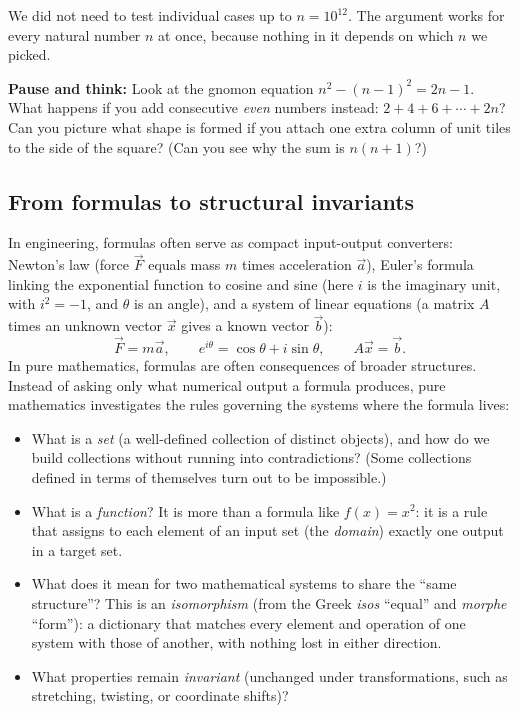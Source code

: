 We did not need to test individual cases up to $n = 10^{12}$. The argument works for every natural number $n$ at once, because nothing in it depends on which $n$ we picked.

\begin{recoverybox}
\textbf{Pause and think:} Look at the gnomon equation $n^2 - (n-1)^2 = 2n - 1$. What happens if you add consecutive \emph{even} numbers instead: $2 + 4 + 6 + \cdots + 2n$? Can you picture what shape is formed if you attach one extra column of unit tiles to the side of the square? (Can you see why the sum is $n(n+1)$?)
\end{recoverybox}

\subsection{From formulas to structural invariants}

In engineering, formulas often serve as compact input-output converters: Newton's law (force $\vec F$ equals mass $m$ times acceleration $\vec a$), Euler's formula linking the exponential function to cosine and sine (here $i$ is the imaginary unit, with $i^2 = -1$, and $\theta$ is an angle), and a system of linear equations (a matrix $A$ times an unknown vector $\vec x$ gives a known vector $\vec b$):
\[
\vec{F} = m\vec{a}, \qquad e^{i\theta} = \cos\theta + i\sin\theta, \qquad A\vec{x} = \vec{b}.
\]
In pure mathematics, formulas are often consequences of broader structures. Instead of asking only what numerical output a formula produces, pure mathematics investigates the rules governing the systems where the formula lives:
\begin{itemize}
\item What is a \emph{set} (a well-defined collection of distinct objects), and how do we build collections without running into contradictions? (Some collections defined in terms of themselves turn out to be impossible.)
\item What is a \emph{function}? It is more than a formula like $f(x) = x^2$: it is a rule that assigns to each element of an input set (the \emph{domain}) exactly one output in a target set.
\item What does it mean for two mathematical systems to share the ``same structure''? This is an \emph{isomorphism} (from the Greek \emph{isos} ``equal'' and \emph{morphe} ``form''): a dictionary that matches every element and operation of one system with those of another, with nothing lost in either direction.
\item What properties remain \emph{invariant} (unchanged under transformations, such as stretching, twisting, or coordinate shifts)?
\end{itemize}

